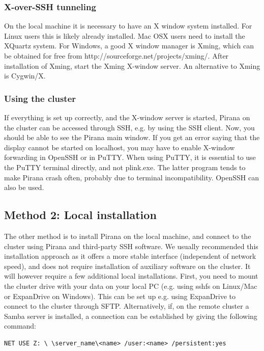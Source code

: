 {{{{\subsubsection*{X-over-SSH tunneling}
On the local machine it is necessary to have an X window system
installed.  For Linux users this is likely already installed. Mac OSX
users need to install the XQuartz system. For Windows, a good X window
manager is Xming, which can be obtained for free from
http://sourceforge.net/projects/xming/. After installation of Xming,
start the Xming X-window server. An alternative to Xming is Cygwin/X.

\subsubsection*{Using the cluster}
If everything is set up correctly, and the X-window server is started,
Pirana on the cluster can be accessed through SSH, e.g. by using the
SSH client. Now, you should be able to see the Pirana main window. If
you get an error saying that the display cannot be started on
localhost, you may have to enable X-window forwarding in OpenSSH or in
PuTTY. When using PuTTY, it is essential to use the PuTTY terminal
directly, and not plink.exe. The latter program tends to make Pirana
crash often, probably due to terminal incompatibility. OpenSSH can
also be used.

\subsection{Method 2: Local installation}
The other method is to install Pirana on the local machine, and
connect to the cluster using Pirana and third-party SSH software. We
usually recommended this installation approach as it offers a more
stable interface (independent of network speed), and does not require
installation of auxiliary software on the cluster. It will however
require a few additional local installations. First, you need to mount
the cluster drive with your data on your local PC (e.g. using sshfs on
Linux/Mac or ExpanDrive on Windows).  This can be set up e.g. using
ExpanDrive to connect to the cluster through SFTP. Alternatively, if,
on the remote cluster a Samba server is installed, a connection can be
established by giving the following command:

\begin{lstlisting}
NET USE Z: \ \server_name\<name> /user:<name> /persistent:yes
\end{lstlisting}

}}}}
